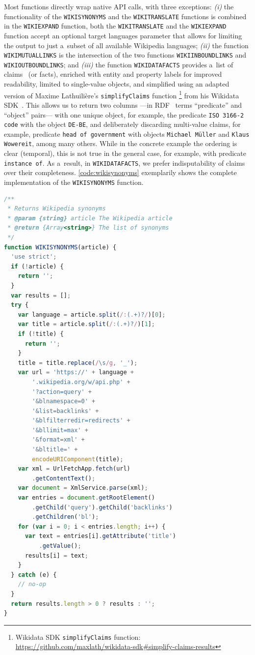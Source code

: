 \documentclass{sig-alternate-05-2015}
\newcommand{\inlinelistingsize}{\fontsize{8pt}{11pt}}
\let\oldurl\url
\renewcommand{\url}[1]{\inlinelistingsize\oldurl{#1}}
\begin{document}
Most functions directly wrap native API calls, with three exceptions:
\emph{(i)} the functionality of the \texttt{WIKISYNONYMS} and the \texttt{WIKITRANSLATE} 
functions is combined in the \texttt{WIKIEXPAND} function,
both the \texttt{WIKITRANSLATE} and the \texttt{WIKIEXPAND} function
accept an optional target languages parameter that allows for limiting
the output to just a~subset of all available Wikipedia languages;
\emph{(ii)} the function \texttt{WIKIMUTUALLINKS} is the intersection
of the two functions \texttt{WIKIINBOUNDLINKS} and \texttt{WIKIOUTBOUNDLINKS};
and \emph{(iii)} the function \texttt{WIKIDATAFACTS} provides
a~list of claims~\cite{vrandecic2014wikidata} (or facts), enriched
with entity and property labels for improved readability,
limited to single-value objects, and simplified using an adapted version of Maxime Lathuilière's
\texttt{simplifyClaims} function%
\footnote{Wikidata SDK \texttt{simplifyClaims} function:
\url{https://github.com/maxlath/wikidata-sdk\#simplify-claims-results}}
from his Wikidata SDK~\cite{lathuiliere2016wikidatasdk}.
This allows us to return two columns%
---in RDF~\cite{cyganiak2014rdf} terms ``predicate'' and ``object'' pairs---%
with one unique object, for example, the predicate \texttt{ISO 3166-2 code}
with the object \texttt{DE-BE},
and deliberately discarding multi-value claims, for example,
predicate \texttt{head of government} with objects \texttt{Michael Müller} and
\texttt{Klaus Wowereit}, among many others.
While in the concrete example the ordering is clear (temporal),
this is not true in the general case, for example, with predicate \texttt{instance of}.
As a~result, in \texttt{WIKIDATAFACTS}, we prefer
indisputability of claims over their completeness.
\autoref{code:wikisynonyms} exemplarily shows the complete implementation
of the \texttt{WIKISYNONYMS} function.

\begin{lstlisting}[caption={Implementation of \texttt{WIKISYNONYMS}.},
  label=code:wikisynonyms, language=JavaScript]
/**
 * Returns Wikipedia synonyms
 * @param {string} article The Wikipedia article
 * @return {Array<string>} The list of synonyms
 */
function WIKISYNONYMS(article) {
  'use strict';
  if (!article) {
    return '';
  }
  var results = [];
  try {
    var language = article.split(/:(.+)?/)[0];
    var title = article.split(/:(.+)?/)[1];
    if (!title) {
      return '';
    }
    title = title.replace(/\s/g, '_');
    var url = 'https://' + language +
        '.wikipedia.org/w/api.php' +
        '?action=query' +
        '&blnamespace=0' +
        '&list=backlinks' +
        '&blfilterredir=redirects' +
        '&bllimit=max' +
        '&format=xml' +
        '&bltitle=' +
        encodeURIComponent(title);
    var xml = UrlFetchApp.fetch(url)
        .getContentText();
    var document = XmlService.parse(xml);
    var entries = document.getRootElement()
        .getChild('query').getChild('backlinks')
        .getChildren('bl');
    for (var i = 0; i < entries.length; i++) {
      var text = entries[i].getAttribute('title')
          .getValue();
      results[i] = text;
    }
  } catch (e) {
    // no-op
  }
  return results.length > 0 ? results : '';
}
\end{lstlisting}
\end{document}
